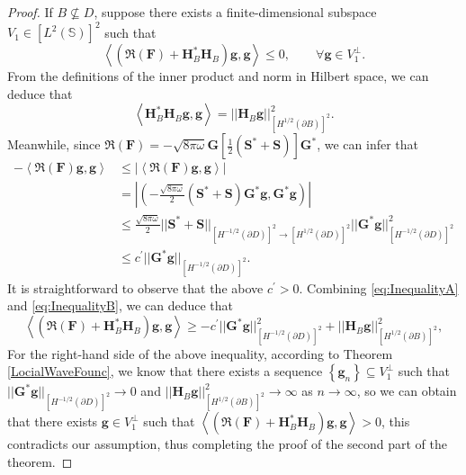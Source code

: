 \documentclass[11pt,reqno,twoside]{amsart}
\theoremstyle{definition}
\theoremstyle{remark}
\numberwithin{equation}{section}
\begin{document}
\begin{proof}
	If $B\nsubseteq D$, suppose there exists a finite-dimensional subspace $V_1\in \left[L^{2}\left(\mathbb S \right) \right]^2$ such that
	$$
		\left\langle \left( \Re\left( \mathbf F\right)+\mathbf H^*_B\mathbf H_B\right) \mathbf g, \mathbf g\right\rangle \leq 0, \qquad \forall \mathbf g \in V_1^\perp
	.$$
	From the definitions of the inner product and norm in Hilbert space, we can deduce that
	\begin{equation}\label{eq:InequalityA}
		\left\langle \mathbf H^*_B\mathbf H_B \mathbf g ,\mathbf g\right\rangle =||\mathbf H_B \mathbf g||^2_{\left[H^{1/2}\left(\partial B \right) \right]^2}.
	\end{equation}
Meanwhile, since $\Re\left( \mathbf F\right) = -\sqrt{8\pi\omega}\mathbf G \left[ \frac{1}{2}\left( \mathbf S^* + \mathbf S\right) \right] \mathbf G^*$, we can infer that
\begin{equation}\begin{aligned}\label{eq:InequalityB}
-\left\langle \Re\left( \mathbf F\right) \mathbf g, \mathbf g\right\rangle
&\leq |\left\langle \Re\left( \mathbf F\right) \mathbf g, \mathbf g\right\rangle| \\
&= \left| \left( -\frac{\sqrt{8\pi\omega}}{2} \left( \mathbf S^*+\mathbf S\right) \mathbf G^* \mathbf g, \mathbf G^* \mathbf g \right) \right| \\
&\leq \frac{\sqrt{8\pi\omega}}{2} ||\mathbf S^*+\mathbf S ||_{\left[H^{-1/2}\left(\partial D\right) \right] ^2 \to \left[H^{1/2}\left(\partial D\right) \right] ^2} ||\mathbf G^* \mathbf g||^2_{\left[H^{-1/2}\left(\partial D \right) \right]^2}\\
&\leq c^{'}||\mathbf G^* \mathbf g||_{\left[H^{-1/2}\left(\partial D \right) \right]^2}.
\end{aligned}\end{equation}
It is straightforward to observe that the above $c^{'} > 0 $. Combining \eqref{eq:InequalityA} and \eqref{eq:InequalityB}, we can deduce that
	$$
	\left\langle \left( \Re\left( \mathbf F\right)+\mathbf H^*_B\mathbf H_B\right) \mathbf g, \mathbf g\right\rangle \geq - c^{'}||\mathbf G^* \mathbf g||^2_{\left[H^{-1/2}\left(\partial D \right) \right]^2} + ||\mathbf H_B \mathbf g||^2_{\left[H^{1/2}\left(\partial B \right) \right]^2},
	$$
	For the right-hand side of the above inequality, according to Theorem \ref{LocialWaveFounc}, we know that there exists a sequence $\left\lbrace \mathbf g_n \right\rbrace \subseteq V_1^\perp$ such that $||\mathbf G^* \mathbf g||_{\left[H^{-1/2}\left(\partial D \right) \right]^2} \to 0$ and $||\mathbf H_B \mathbf g||^2_{\left[H^{1/2}\left(\partial B \right) \right]^2} \to \infty$ as $n\to \infty$, so we can obtain that there exists $\mathbf g \in V_1^\perp $ such that $ \left\langle \left( \Re\left( \mathbf F\right)+\mathbf H^*_B\mathbf H_B\right) \mathbf g, \mathbf g\right\rangle > 0$, this contradicts our assumption, thus completing the proof of the second part of the theorem.
\end{proof}
\end{document}
